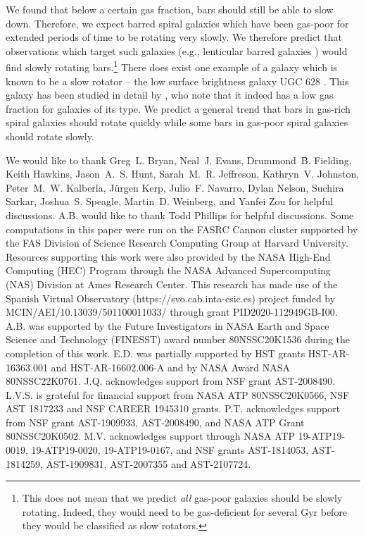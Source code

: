 \documentclass[twocolumn,linenumbers]{aastex631}
\begin{document}
We found that below a certain gas fraction, bars should still be able to slow
down. Therefore, we expect barred spiral galaxies which have been gas-poor for
extended periods of time to be rotating very slowly. We therefore predict that
observations which target such galaxies (e.g., lenticular barred galaxies
\citep{2009ARAA..47..159B}) would find slowly rotating bars.\footnote{This does
not mean that we predict \textit{all} gas-poor galaxies should be slowly
rotating. Indeed, they would need to be gas-deficient for several $\textrm{Gyr}$
before they would be classified as slow rotators.} There does exist one example
of a galaxy which is known to be a slow rotator -- the low surface brightness
galaxy UGC 628 \citep{2009AA...499L..25C}. This galaxy has been studied in
detail by \citet{2016MNRAS.463.1751C}, who note that it indeed has a low gas
fraction for galaxies of its type. We predict a general trend that bars in
gas-rich spiral galaxies should rotate quickly while some bars in gas-poor
spiral galaxies should rotate slowly.

\begin{acknowledgments}
  We would like to thank Greg~L. Bryan, Neal~J. Evans, Drummond~B. Fielding,
  Keith Hawkins, Jason~A.~S. Hunt, Sarah~M.~R. Jeffreson, Kathryn~V. Johnston,
  Peter~M.~W. Kalberla, Jürgen Kerp, Julio~F. Navarro, Dylan Nelson, Suchira
  Sarkar, Joshua~S. Speagle, Martin~D. Weinberg, and Yanfei Zou for helpful
  discussions. A.B. would like to thank Todd Phillips for helpful discussions.
  Some computations in this paper were run on the FASRC Cannon cluster supported
  by the FAS Division of Science Research Computing Group at Harvard University.
  Resources supporting this work were also provided by the NASA High-End
  Computing (HEC) Program through the NASA Advanced Supercomputing (NAS)
  Division at Ames Research Center. This research has made use of the Spanish
  Virtual Observatory (https://svo.cab.inta-csic.es) project funded by
  MCIN/AEI/10.13039/501100011033/ through grant PID2020-112949GB-I00. A.B. was
  supported by the Future Investigators in NASA Earth and Space Science and
  Technology (FINESST) award number 80NSSC20K1536 during the completion of this
  work. E.D. was partially supported by HST grants HST-AR-16363.001 and
  HST-AR-16602.006-A and by NASA Award NASA 80NSSC22K0761. J.Q. acknowledges
  support from NSF grant AST-2008490. L.V.S. is grateful for financial support
  from NASA ATP 80NSSC20K0566, NSF AST 1817233 and NSF CAREER 1945310 grants.
  P.T. acknowledges support from NSF grant AST-1909933, AST-2008490, and NASA
  ATP Grant 80NSSC20K0502. M.V. acknowledges support through NASA ATP
  19-ATP19-0019, 19-ATP19-0020, 19-ATP19-0167, and NSF grants AST-1814053,
  AST-1814259, AST-1909831, AST-2007355 and AST-2107724.
\end{acknowledgments}
\end{document}
